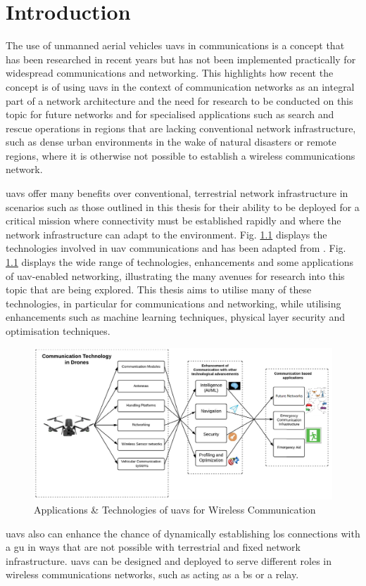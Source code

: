 \chapter{Introduction}
The use of unmanned aerial vehicles \acrshort{uav}s in communications is a concept that has been researched in recent years but has not been implemented practically for widespread communications and networking. 
This highlights how recent the concept is of using \acrshort{uav}s in the context of communication networks as an integral part of a network architecture and the need for research to be conducted on this topic for future networks and for specialised applications such as search and rescue operations in regions that are lacking conventional network infrastructure, such as dense urban environments in the wake of natural disasters or remote regions, where it is otherwise not possible to establish a wireless communications network. 

\acrshort{uav}s offer many benefits over conventional, terrestrial network infrastructure in scenarios such as those outlined in this thesis for their ability to be deployed for a critical mission where connectivity must be established rapidly and where the network infrastructure can adapt to the environment. 
Fig. \ref{fig:scope_of_uav_comms} displays the technologies involved in \acrshort{uav} communications and has been adapted from \cite{sharma_communication_2020}. 
Fig. \ref{fig:scope_of_uav_comms} displays the wide range of technologies, enhancements and some applications of \acrshort{uav}-enabled networking, illustrating the many avenues for research into this topic that are being explored. 
This thesis aims to utilise many of these technologies, in particular for communications and networking, while utilising enhancements such as machine learning techniques, physical layer security and optimisation techniques. 

\begin{figure} [ht!]
    \centering
    \includegraphics[width=1\linewidth]{figures/edited_scope_of_uav_communications.png}
    \caption{Applications \& Technologies of \acrshort{uav}s for Wireless Communication}
    \label{fig:scope_of_uav_comms}
\end{figure}
\acrshort{uav}s also can enhance the chance of dynamically establishing \acrfull{los} connections with a \acrfull{gu} in ways that are not possible with terrestrial and fixed network infrastructure.
\acrshort{uav}s can be designed and deployed to serve different roles in wireless communications networks, such as acting as a \acrfull{bs} or a relay. 

